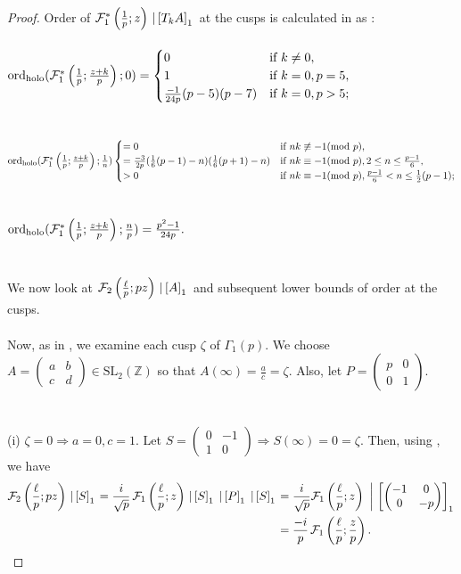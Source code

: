 \documentclass[12pt]{amsart}
\theoremstyle{definition}
\theoremstyle{remark}
\numberwithin{equation}{section}
\newcommand{\SL}{\mbox{SL}}
\newcommand\Fell[4]{\mathcal{F}_{#1}\left(\frac{#2}{#3};#4\right)}
\newcommand\SFell[4]{\mathcal{F}_{#1}^{*}\left(\frac{#2}{#3};#4\right)}
\newcommand\strokeb[2]{\,\left\arrowvert\,\left[#1\right]_#2\right.}
\newcommand\stroke[3]{#1\,\left\arrowvert\,\left[#2\right]_{#3}\right.}
\newcommand\hord{\mbox{ord}_{\mbox{\scriptsize holo}}}
\begin{document}
\begin{proof}
Order of $\SFell{1}{1}{p}{z}\stroke{}{T_kA}{1}$ at the cusps is calculated in \cite[Theorem 6.9, p.237-238]{Ga19a} as :
\\\\
$\hord(\SFell{1}{1}{p}{\frac{z+k}{p}};0)=\begin{cases}
      0 & \text{if}\ k\neq 0, \\
      1 & \text{if}\ k=0, p=5, \\
       \frac{-1}{24p}(p-5)(p-7) & \text{if}\ k=0, p>5;
    \end{cases}$
\\\\\\
$\hord(\SFell{1}{1}{p}{\frac{z+k}{p}};\frac{1}{n})\begin{cases}
      = 0 & \text{if}\ nk \not\equiv -1(\textrm{mod}\ p), \\ 
       =\frac{-3}{2p}(\frac{1}{6} (p-1)-n)(\frac{1}{6} (p+1)-n) & \text{if}\ nk \equiv -1(\textrm{mod}\ p), 2\leq n \leq \frac{p-1}{6}, \\
       >0 & \text{if}\ nk \equiv -1(\textrm{mod}\ p), \frac{p-1}{6}< n \leq \frac{1}{2}(p-1);
    \end{cases}$
\\\\\\
$\hord(\SFell{1}{1}{p}{\frac{z+k}{p}};\frac{n}{p})=\frac{p^2-1}{24p}.$
\\\\\\
We now look at $\Fell{2}{\ell}{p}{p z} \stroke{}{A}{1}$ and subsequent lower bounds of order at the cusps.
\\\\
Now, as in \cite{Ga19a}, we examine each cusp $\zeta$ of $\Gamma_1(p)$. We choose $A = \begin{pmatrix} a & b \\ c & d\end{pmatrix} \in \SL_2(\mathbb{Z})$ so that $A(\infty)=\frac{a}{c}=\zeta$. Also, let $P = \begin{pmatrix} p & 0 \\ 0 & 1\end{pmatrix}$.
\\\\\\
(i) $\zeta=0 \Rightarrow a=0,c=1$. Let $S = \begin{pmatrix} 0 & -1 \\ 1 & 0\end{pmatrix} \Rightarrow S(\infty)=0=\zeta$. Then, using \cite[Theorem 4.5, p.220]{Ga19a}, we have 
\\
\begin{align*}
\Fell{2}{\ell}{p}{pz} \strokeb{S}{1}=
 \frac{i}{\sqrt{p}}\,\Fell{1}{\ell}{p}{z} \strokeb{S}{1} \strokeb{P}{1} \strokeb{S}{1}&=\frac{i}{\sqrt{p}}\Fell{1}{\ell}{p}{z} \strokeb{\begin{pmatrix} -1 & 0 \\ 0 & -p\end{pmatrix}}{1}
 \\
 &=\frac{-i}{p}\,\Fell{1}{\ell}{p}{\frac{z}{p}}.
\end{align*}


\end{proof}
\end{document}
